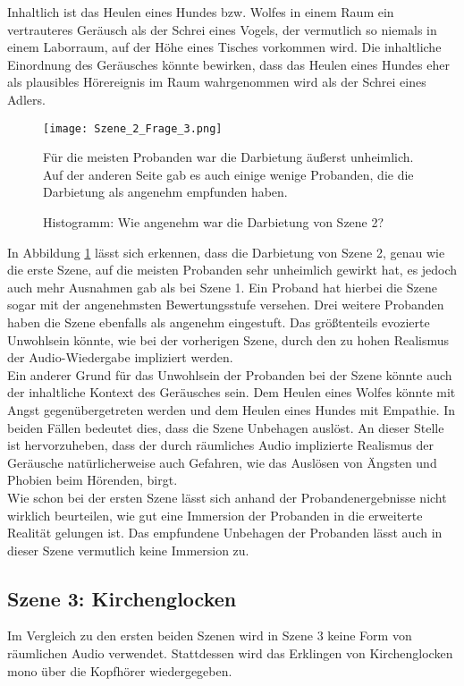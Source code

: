 Inhaltlich ist das Heulen eines Hundes bzw. Wolfes in einem Raum ein vertrauteres Geräusch als der Schrei eines Vogels, der vermutlich so niemals in einem Laborraum, auf der Höhe eines Tisches vorkommen wird. Die inhaltliche Einordnung des Geräusches könnte bewirken, dass das Heulen eines Hundes eher als plausibles Hörereignis im Raum wahrgenommen wird als der Schrei eines Adlers. 

\begin{figure}[H]
\centering
\texttt{[image: Szene\_2\_Frage\_3.png]}
\caption{Histogramm: Wie angenehm war die Darbietung von Szene 2?}
Für die meisten Probanden war die Darbietung äußerst unheimlich. Auf der anderen Seite gab es auch einige wenige Probanden, die die Darbietung als angenehm empfunden haben. 
\label{fig:Szene_2_Frage3}
\end{figure} 

\vspace*{20pt}

In Abbildung \ref{fig:Szene_2_Frage3} lässt sich erkennen, dass die Darbietung von Szene 2, genau wie die erste Szene, auf die meisten Probanden sehr unheimlich gewirkt hat, es jedoch auch mehr Ausnahmen gab als bei Szene 1. Ein Proband hat hierbei die Szene sogar mit der angenehmsten Bewertungsstufe versehen. Drei weitere Probanden haben die Szene ebenfalls als angenehm eingestuft. Das größtenteils evozierte Unwohlsein könnte, wie bei der vorherigen Szene, durch den zu hohen Realismus der Audio-Wiedergabe impliziert werden. \\ 

Ein anderer Grund für das Unwohlsein der Probanden bei der Szene könnte auch der inhaltliche Kontext des Geräusches sein. Dem Heulen eines Wolfes könnte mit Angst gegenübergetreten werden und dem Heulen eines Hundes mit Empathie. In beiden Fällen bedeutet dies, dass die Szene Unbehagen auslöst. An dieser Stelle ist hervorzuheben, dass der durch räumliches Audio implizierte Realismus der Geräusche natürlicherweise auch Gefahren, wie das Auslösen von Ängsten und Phobien beim Hörenden, birgt. \\

Wie schon bei der ersten Szene lässt sich anhand der Probandenergebnisse nicht wirklich beurteilen, wie gut eine Immersion der Probanden in die erweiterte Realität gelungen ist. Das empfundene Unbehagen der Probanden lässt auch in dieser Szene vermutlich keine Immersion zu. 

\newpage

 \subsection{Szene 3: Kirchenglocken}
Im Vergleich zu den ersten beiden Szenen wird in Szene 3 keine Form von räumlichen Audio verwendet. Stattdessen wird das Erklingen von Kirchenglocken mono über die Kopfhörer wiedergegeben.\\

